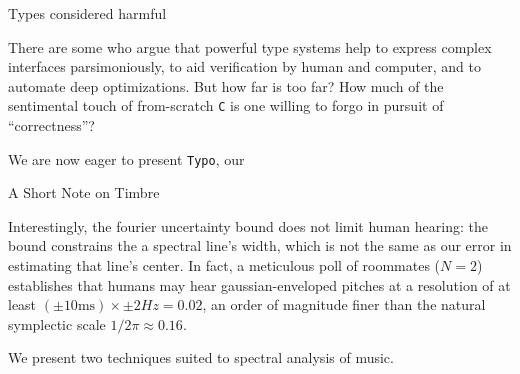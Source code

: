 \documentclass[12pt]{article}
\theoremstyle{definition}
\begin{document}
{
    \centering \Huge \sf \color{mblu} 
    Types considered harmful
    \vspace{0.5cm}
}

    There are some who argue that powerful type systems help 
        to express complex interfaces parsimoniously,
        to aid verification by human and computer, and
        to automate deep optimizations. 
    But how far is too far?  How much of the sentimental touch of from-scratch
    \texttt{C} is one willing to forgo in pursuit of ``correctness''? 

    We are now eager to present \texttt{Typo}, our 



{
    \centering \Huge \sf \color{mblu} 
    A Short Note on Timbre
    \vspace{0.5cm}
}

    Interestingly, the fourier uncertainty bound does not limit human hearing:
    the bound constrains the a spectral line's width, which is not the same as
    our error in estimating that line's center.  In fact, a meticulous poll of
    roommates ($N=2$) establishes that humans may hear gaussian-enveloped
    pitches at a resolution of at least $(\pm 10\text{ms}) \times \pm 2 Hz =
    0.02$, an order of magnitude finer than the natural symplectic scale
    $1/2\pi \approx 0.16$. 

    We present two techniques suited to spectral analysis of music.


\end{document}
